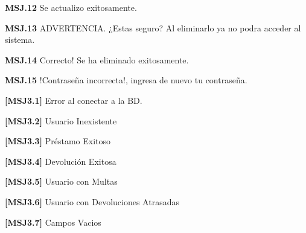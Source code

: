 	\begin{Citemize}
	\item {\bf MSJ.12} Se actualizo exitosamente.
	\end{Citemize}
	
	\begin{Citemize}
	\item {\bf MSJ.13} ADVERTENCIA. ¿Estas seguro? Al eliminarlo ya no podra acceder al sistema.
	\end{Citemize}
	
	\begin{Citemize}
	\item {\bf MSJ.14} Correcto! Se ha eliminado exitosamente.
	\end{Citemize}
	
	\begin{Citemize}
	\item {\bf MSJ.15} !Contraseña incorrecta!, ingresa de nuevo tu contraseña.
	\end{Citemize}

	\begin{Citemize}
	\item {\bf [MSJ3.1]} Error al conectar a la BD.
	\end{Citemize}

	\begin{Citemize}
	\item {\bf [MSJ3.2]} Usuario Inexistente
	\end{Citemize}
	
	\begin{Citemize}
	\item {\bf [MSJ3.3]} Préstamo Exitoso
	\end{Citemize}
	
	\begin{Citemize}
	\item {\bf [MSJ3.4]} Devolución Exitosa
	\end{Citemize}
	
	\begin{Citemize}
	\item {\bf [MSJ3.5]} Usuario con Multas
	\end{Citemize}
	
	\begin{Citemize}
	\item {\bf [MSJ3.6]} Usuario con Devoluciones Atrasadas
	\end{Citemize}
	
	\begin{Citemize}
	\item {\bf [MSJ3.7]} Campos Vacios
	\end{Citemize}
	
